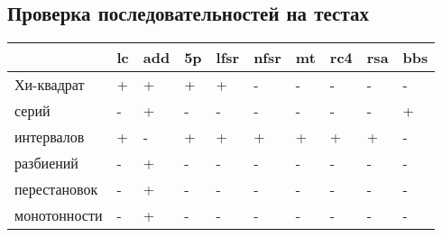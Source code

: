 \documentclass[spec, och, labwork]{shiza}
\begin{document}
\subsection{Проверка последовательностей на тестах }
\begin{flushleft}
    \begin{tabular}[t]{|p{3cm}|p{1cm}|p{1cm}|p{1cm}|p{1cm}|p{1cm}|p{1cm}|p{1cm}|p{1cm}|p{1cm}|} \hline 
                  & lc	&  add	&  5p	& lfsr	& nfsr  & mt	& rc4	& rsa	& bbs \\[2mm]\hline
    Хи-квадрат	  &  +  &   +   &  +  &  +    & 	-   &  -  &  -  &  -  &  -  \\[2mm]\hline
    серий	        &  -  &   +   &  -  &  -    &   -   &  -  &  -	&  -  &  +  \\[2mm]\hline
    интервалов  	&  +  &   -   &  +  &  +    &   +   &  +  &  +  &  +  &  -  \\[2mm]\hline
    разбиений	    &  -  &   +   &  -	&  -    &   -   &  -  &  -  &  -  &  -  \\[2mm]\hline
    перестановок	&  -  &   +   &  -	& -     &   -   &  -  &  -  &  -  &  -  \\[2mm]\hline
    монотонности	&  -  &   +   &  -	& -     &   -   &  -  &  -  &  -  &  -  \\[2mm]\hline
  \end{tabular}
\end{flushleft}
\end{document}
